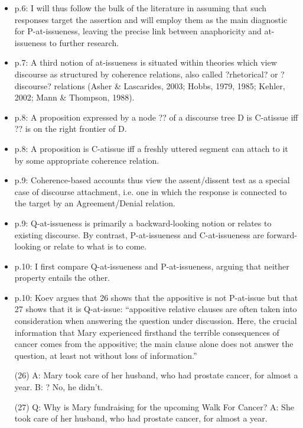 \documentclass[11pt,fleqn]{article}
\newcommand{\6}{\mbox{$[\hspace*{-.6mm}[$}}
\newcommand{\9}{\mbox{$]\hspace*{-.6mm}]$}}
\begin{document}
\begin{itemize}
\begin{itemize}
\begin{itemize}
\item p.6: I will thus follow the bulk of the literature in assuming that such responses target the assertion and will employ them as the main diagnostic for P-at-issueness, leaving the precise link between anaphoricity and at-issueness to further research.

\item p.7: A third notion of at-issueness is situated within theories which view discourse as structured by coherence relations, also called ?rhetorical? or ?discourse? relations (Asher \& Lascarides, 2003; Hobbs, 1979, 1985; Kehler, 2002; Mann \& Thompson, 1988). 

\item p.8:  A proposition expressed by a node ?? of a discourse tree D is C-atissue iff ?? is on the right frontier of D.

\item p.8: A proposition is C-atissue iff a freshly uttered segment can attach to it by some appropriate coherence relation.

\item p.9: Coherence-based accounts thus view the assent/dissent test as a special case of discourse attachment, i.e. one in which the response is connected to the target by an Agreement/Denial relation. 

\item p.9: Q-at-issueness is primarily a backward-looking notion or relates to existing discourse. By contrast, P-at-issueness and C-at-issueness are forward-looking or relate to what is to come. 

\item p.10: I first compare Q-at-issueness and P-at-issueness, arguing that neither property entails the other.

\item p.10: Koev argues that 26 shows that the appositive is not P-at-issue but that 27 shows that it is Q-at-issue: ``appositive relative clauses are often taken into consideration when answering the question under discussion. Here, the crucial information that Mary experienced firsthand the terrible consequences of cancer comes from the appositive; the main clause alone does not answer the question, at least not without loss of information.''

(26) A: Mary took care of her husband, who had prostate cancer, for almost a year. B: ? No, he didn't.

(27) Q: Why is Mary fundraising for the upcoming Walk For Cancer?
A: She took care of her husband, who had prostate cancer, for almost a year.


\end{itemize}
\end{itemize}
\end{itemize}
\end{document}
